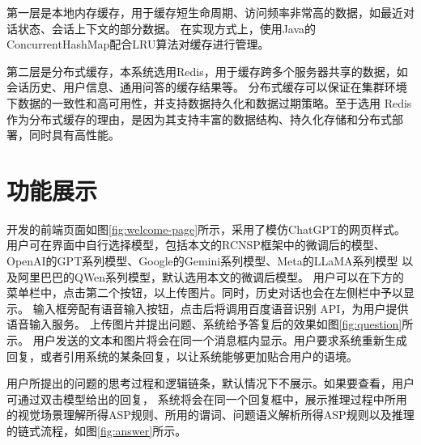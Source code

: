 第一层是本地内存缓存，用于缓存短生命周期、访问频率非常高的数据，如最近对话状态、会话上下文的部分数据。
在实现方式上，使用Java的ConcurrentHashMap配合LRU算法对缓存进行管理。

第二层是分布式缓存，本系统选用Redis，用于缓存跨多个服务器共享的数据，如会话历史、用户信息、通用问答的缓存结果等。
分布式缓存可以保证在集群环境下数据的一致性和高可用性，并支持数据持久化和数据过期策略。至于选用
Redis作为分布式缓存的理由，是因为其支持丰富的数据结构、持久化存储和分布式部署，同时具有高性能。

\section{功能展示}
开发的前端页面如图\ref{fig:welcome-page}所示，采用了模仿ChatGPT的网页样式。
用户可在界面中自行选择模型，包括本文的RCNSP框架中的微调后的模型、OpenAI的GPT系列模型、Google的Gemini系列模型、Meta的LLaMA系列模型
以及阿里巴巴的QWen系列模型，默认选用本文的微调后模型。
用户可以在下方的菜单栏中，点击第二个按钮，以上传图片。同时，历史对话也会在左侧栏中予以显示。
输入框旁配有语音输入按钮，点击后将调用百度语音识别 API，为用户提供语音输入服务。
上传图片并提出问题、系统给予答复后的效果如图\ref{fig:question}所示。
用户发送的文本和图片将会在同一个消息框内显示。用户要求系统重新生成回复，或者引用系统的某条回复，以让系统能够更加贴合用户的语境。

用户所提出的问题的思考过程和逻辑链条，默认情况下不展示。如果要查看，用户可通过双击模型给出的回复，
系统将会在同一个回复框中，展示推理过程中所用的视觉场景理解所得ASP规则、所用的谓词、问题语义解析所得ASP规则以及推理的链式流程，如图\ref{fig:answer}所示。

